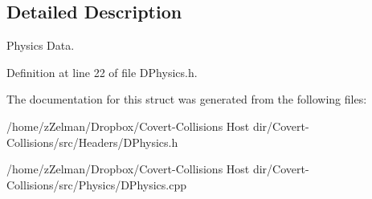\subsection{Detailed Description}
Physics Data. 

Definition at line 22 of file D\-Physics.\-h.



The documentation for this struct was generated from the following files\-:\begin{DoxyCompactItemize}
\item 
/home/z\-Zelman/\-Dropbox/\-Covert-\/\-Collisions Host dir/\-Covert-\/\-Collisions/src/\-Headers/D\-Physics.\-h\item 
/home/z\-Zelman/\-Dropbox/\-Covert-\/\-Collisions Host dir/\-Covert-\/\-Collisions/src/\-Physics/D\-Physics.\-cpp\end{DoxyCompactItemize}
